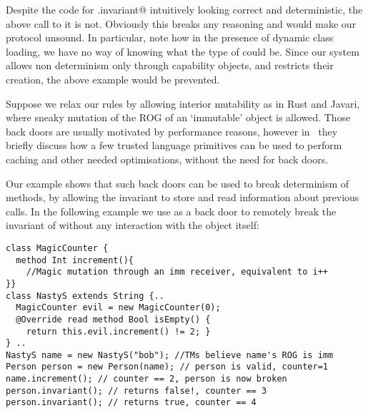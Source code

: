 Despite the code for \Q@Person.invariant@ intuitively looking correct and deterministic, the above call to it is not. Obviously this breaks any reasoning and would make our protocol unsound. 
In particular, note how in the presence of dynamic class loading, we have no way of knowing what the type of \Q@name@ could be. Since our system allows non determinism only through capability objects, and 
restricts their creation, the above example would be prevented.

Suppose we relax our rules by allowing interior mutability
as in Rust and Javari, where sneaky mutation
of the ROG of an `immutable' object is allowed.
Those back doors are usually motivated by performance reasons, however in~\cite{GordonEtAl12} they
briefly discuss how a few trusted language primitives can be used to perform caching and other needed optimisations,
without the need for back doors.

Our example shows that such back doors can be used to break determinism of \Q@invariant@ methods, by allowing the invariant to store and read information about previous calls. In the following example we use \Q@MagicCounter@ as a back door to remotely break the invariant of \Q@person@ without any interaction with the \Q@person@ object itself:
\begin{lstlisting}
class MagicCounter {
  method Int increment(){
    //Magic mutation through an imm receiver, equivalent to i++
}}
class NastyS extends String {..
  MagicCounter evil = new MagicCounter(0);
  @Override read method Bool isEmpty() {
    return this.evil.increment() != 2; }
} ..
NastyS name = new NastyS("bob"); //TMs believe name's ROG is imm
Person person = new Person(name); // person is valid, counter=1
name.increment(); // counter == 2, person is now broken
person.invariant(); // returns false!, counter == 3
person.invariant(); // returns true, counter == 4
\end{lstlisting}

